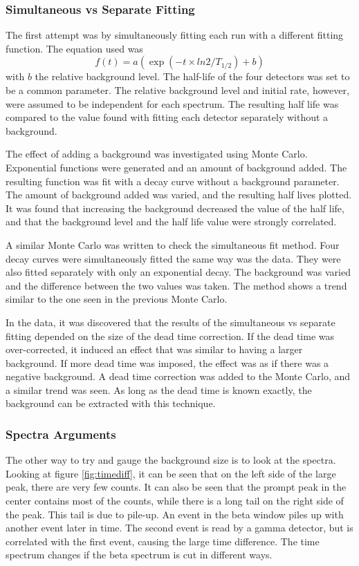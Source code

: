 \documentclass[MaxHughesThesis.tex]{subfiles}
\begin{document}
\subsubsection{Simultaneous vs Separate Fitting}
The first attempt was by simultaneously fitting each run with a different fitting function.
The equation used was 
%
\begin{equation}
	f(t) = a(\exp(-t \times ln2/T_{1/2}) + b)
	\label{eq:fit-bg}
\end{equation}
%
with $b$ the relative background level.
The half-life of the four detectors was set to be a common parameter. 
The relative background level and initial rate, however, were assumed to be independent for each spectrum.
The resulting half life was compared to the value found with fitting each detector separately without a background.

The effect of adding a background was investigated using Monte Carlo.
Exponential functions were generated and an amount of background added.
The resulting function was fit with a decay curve without a background parameter.
The amount of background added was varied, and the resulting half lives plotted.
It was found that increasing the background decreased the value of the half life, and that the background level and the half life value were strongly correlated.

A similar Monte Carlo was written to check the simultaneous fit method.
Four decay curves were simultaneously fitted the same way was the data.
They were also fitted separately with only an exponential decay.
The background was varied and the difference between the two values was taken.
The method shows a trend similar to the one seen in the previous Monte Carlo.

In the data, it was discovered that the results of the simultaneous vs separate fitting depended on the size of the dead time correction.
If the dead time was over-corrected, it induced an effect that was similar to having a larger background.
If more dead time was imposed, the effect was as if there was a negative background.
A dead time correction was added to the Monte Carlo, and a similar trend was seen.
As long as the dead time is known exactly, the background can be extracted with this technique. 

\subsubsection{Spectra Arguments}
The other way to try and gauge the background size is to look at the spectra.
Looking at figure \ref{fig:timediff}, it can be seen that on the left side of the large peak, there are very few counts.
It can also be seen that the prompt peak in the center contains most of the counts, while there is a long tail on the right side of the peak.
This tail is due to pile-up. 
An event in the beta window piles up with another event later in time. 
The second event is read by a gamma detector, but is correlated with the first event, causing the large time difference.
The time spectrum changes if the beta spectrum is cut in different ways.
\end{document}

